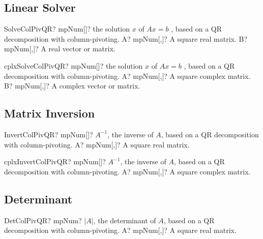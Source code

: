 \subsection{Linear Solver}


\begin{mpFunctionsExtract}
	\mpFunctionTwo
	{SolveColPivQR? mpNum[]? the solution $x$ of $A x = b$ , based on a QR decomposition with column-pivoting.}
	{A? mpNum[,]? A square real matrix.}
	{B? mpNum[,]? A real vector or matrix.}
\end{mpFunctionsExtract}


\vspace{0.6cm}
\begin{mpFunctionsExtract}
	\mpFunctionTwo
	{cplxSolveColPivQR? mpNum[]? the solution $x$ of $A x = b$ , based on a QR decomposition with column-pivoting.}
	{A? mpNum[,]? A square complex matrix.}
	{B? mpNum[,]? A complex vector or matrix.}
\end{mpFunctionsExtract}





\subsection{Matrix Inversion}

\begin{mpFunctionsExtract}
	\mpFunctionOne
	{InvertColPivQR? mpNum[]? $A^{-1}$, the inverse of $A$, based on a QR decomposition with column-pivoting.}
	{A? mpNum[,]? A square real matrix.}
\end{mpFunctionsExtract}

\vspace{0.6cm}
\begin{mpFunctionsExtract}
	\mpFunctionOne
	{cplxInvertColPivQR? mpNum[]? $A^{-1}$, the inverse of $A$, based on a QR decomposition with column-pivoting.}
	{A? mpNum[,]? A square complex matrix.}
\end{mpFunctionsExtract}




\subsection{Determinant}

\begin{mpFunctionsExtract}
	\mpFunctionOne
	{DetColPivQR? mpNum? $|A|$, the determinant of $A$, based on a QR decomposition with column-pivoting.}
	{A? mpNum[,]? A square real matrix.}
\end{mpFunctionsExtract}

